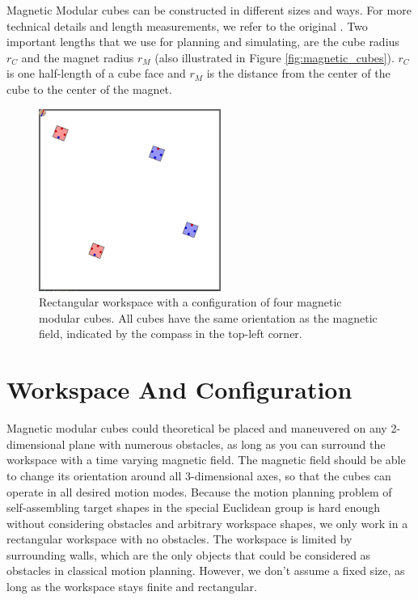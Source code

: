 Magnetic Modular cubes can be constructed in different sizes and ways. For more technical details and length measurements, we refer to the original \cite{Bhattacharjee2022}.
Two important lengths that we use for planning and simulating, are the cube radius $r_C$ and the magnet radius $r_M$ (also illustrated in Figure \ref{fig:magnetic_cubes}).
$r_C$ is one half-length of a cube face and $r_M$ is the distance from the center of the cube to the center of the magnet.

\begin{figure}
	\centering
	\includegraphics[width=0.53\textwidth]{figures/workspace_config.png}
	\caption{Rectangular workspace with a configuration of four magnetic modular cubes. All cubes have the same orientation as the magnetic field, indicated by the compass in the top-left corner.}
	\label{fig:workspace_config}
\end{figure}

\section{Workspace And Configuration}
Magnetic modular cubes could theoretical be placed and maneuvered on any 2-dimensional plane with numerous obstacles, as long as you can surround the workspace with a time varying magnetic field.
The magnetic field should be able to change its orientation around all 3-dimensional axes, so that the cubes can operate in all desired motion modes.
Because the motion planning problem of self-assembling target shapes in the special Euclidean group is hard enough without considering obstacles and arbitrary workspace shapes, we only work in a rectangular workspace with no obstacles.
The workspace is limited by surrounding walls, which are the only objects that could be considered as obstacles in classical motion planning.
However, we don't assume a fixed size, as long as the workspace stays finite and rectangular.


